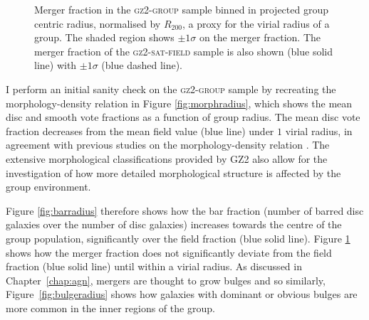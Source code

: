 \begin{figure}
\caption{Merger fraction in the \textsc{gz2-group} sample binned in projected group centric radius, normalised by $R_{200}$, a proxy for the virial radius of a group. The shaded region shows $\pm1\sigma$ on the merger fraction. The merger fraction of the \textsc{gz2-sat-field} sample is also shown (blue solid line) with $\pm1\sigma$ (blue dashed line).}
\label{fig:mergerradius}
\end{figure}


I perform an initial sanity check on the \textsc{gz2-group} sample by recreating the morphology-density relation \citep{dressler80} in Figure \ref{fig:morphradius}, which shows the mean disc and smooth vote fractions as a function of group radius. The mean disc vote fraction decreases from the mean field value (blue line) under $1$ virial radius, in agreement with previous studies on the morphology-density relation \citep{dressler80, smail97, poggianti99, postman05, Bamford09}. The extensive morphological classifications provided by GZ2 also allow for the investigation of how more detailed morphological structure is affected by the group environment.  

Figure \ref{fig:barradius} therefore  shows how the bar fraction (number of barred disc galaxies over the number of disc galaxies) increases towards the centre of the group population, significantly over the field fraction (blue solid line). Figure \ref{fig:mergerradius} shows how the merger fraction does not significantly deviate from the field fraction (blue solid line) until within a virial radius. As discussed in Chapter~\ref{chap:agn}, mergers are thought to grow bulges and so similarly, Figure~\ref{fig:bulgeradius} shows how galaxies with dominant or obvious bulges are more common in the inner regions of the group. 

